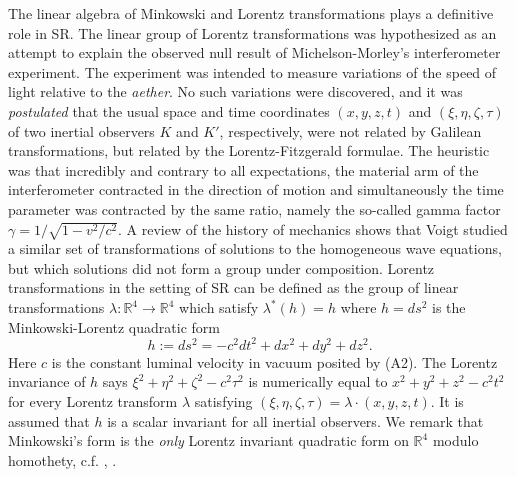 \documentclass[12pt]{amsart}
\newcommand{\bR}{\mathbb{R}}
\begin{document}
The linear algebra of Minkowski and Lorentz transformations plays a definitive role in SR. The linear group of Lorentz transformations was hypothesized as an attempt to explain the observed null result of Michelson-Morley's interferometer experiment. The experiment was intended to measure variations of the speed of light relative to the \emph{aether}. No such variations were discovered, and it was \emph{postulated} that the usual space and time coordinates $(x,y,z,t)$ and $(\xi, \eta, \zeta, \tau)$ of two inertial observers $K$ and $K'$, respectively, were not related by Galilean transformations, but related by the Lorentz-Fitzgerald formulae. The heuristic was that incredibly and contrary to all expectations, the material arm of the interferometer contracted in the direction of motion and simultaneously the time parameter was contracted by the same ratio, namely the so-called gamma factor $\gamma = 1/\sqrt{1-v^2/c^2}$. A review of the history of mechanics \cite{dugas} shows that Voigt studied a similar set of transformations of solutions to the homogeneous wave equations, but which solutions did not form a group under composition. Lorentz transformations in the setting of SR can be defined as the group of linear transformations $\lambda: \bR^{4} \to \bR^4$ which satisfy $\lambda^*(h)=h$ where $h=ds^2$ is the Minkowski-Lorentz quadratic form \begin{equation}\label{mform}
h:=ds^2=-c^2dt^2+dx^2+dy^2+dz^2.\end{equation} 
Here $c$ is the constant luminal velocity in vacuum posited by (A2). The Lorentz invariance of $h$ says $\xi^2+\eta^2+\zeta^2-c^2 \tau^2$ is numerically equal to $x^2+y^2+z^2-c^2 t^2$ for every Lorentz transform $\lambda$ satisfying $(\xi, \eta, \zeta, \tau)=\lambda \cdot (x,y,z,t)$. It is assumed that $h$ is a scalar invariant for all inertial observers. We remark that Minkowski's form is the \emph{only} Lorentz invariant quadratic form on $\bR^4$ modulo homothety, c.f. \cite{elton2010indefinite}, \cite{arminjon2018lorentz}. 




\end{document}
